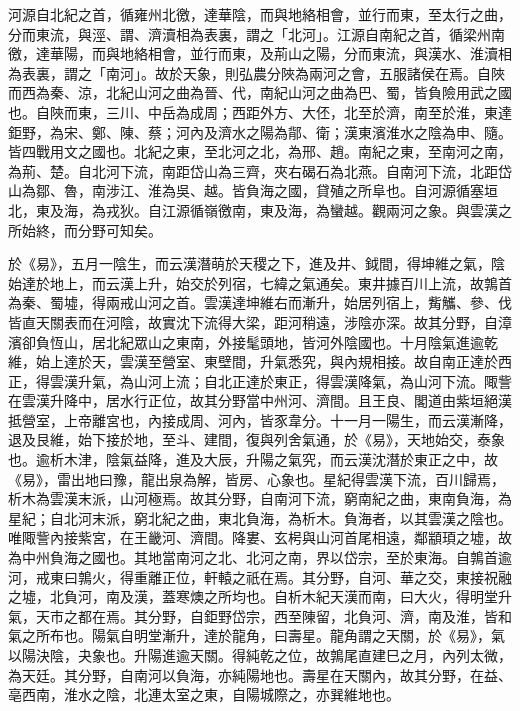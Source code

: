 \begin{pinyinscope}
 河源自北紀之首，循雍州北徼，達華陰，而與地絡相會，並行而東，至太行之曲，分而東流，與涇、謂、濟瀆相為表裏，謂之「北河」。江源自南紀之首，循梁州南徼，達華陽，而與地絡相會，並行而東，及荊山之陽，分而東流，與漢水、淮瀆相為表裏，謂之「南河」。故於天象，則弘農分陜為兩河之會，五服諸侯在焉。自陜而西為秦、涼，北紀山河之曲為晉、代，南紀山河之曲為巴、蜀，皆負險用武之國也。自陜而東，三川、中岳為成周；西距外方、大伾，北至於濟，南至於淮，東達鉅野，為宋、鄭、陳、蔡；河內及濟水之陽為鄁、衛；漢東濱淮水之陰為申、隨。皆四戰用文之國也。北紀之東，至北河之北，為邢、趙。南紀之東，至南河之南，為荊、楚。自北河下流，南距岱山為三齊，夾右碣石為北燕。自南河下流，北距岱山為鄒、魯，南涉江、淮為吳、越。皆負海之國，貸殖之所阜也。自河源循塞垣北，東及海，為戎狄。自江源循嶺徼南，東及海，為蠻越。觀兩河之象。與雲漢之所始終，而分野可知矣。



 於《易》，五月一陰生，而云漢潛萌於天稷之下，進及井、鉞間，得坤維之氣，陰始達於地上，而云漢上升，始交於列宿，七緯之氣通矣。東井據百川上流，故鶉首為秦、蜀墟，得兩戒山河之首。雲漢達坤維右而漸升，始居列宿上，觜觿、參、伐皆直天關表而在河陰，故實沈下流得大梁，距河稍遠，涉陰亦深。故其分野，自漳濱卻負恆山，居北紀眾山之東南，外接髦頭地，皆河外陰國也。十月陰氣進逾乾維，始上達於天，雲漢至營室、東壁間，升氣悉究，與內規相接。故自南正達於西正，得雲漢升氣，為山河上流；自北正達於東正，得雲漢降氣，為山河下流。陬訾在雲漢升降中，居水行正位，故其分野當中州河、濟間。且王良、閣道由紫垣絕漢抵營室，上帝離宮也，內接成周、河內，皆豕韋分。十一月一陽生，而云漢漸降，退及艮維，始下接於地，至斗、建間，復與列舍氣通，於《易》，天地始交，泰象也。逾析木津，陰氣益降，進及大辰，升陽之氣究，而云漢沈潛於東正之中，故《易》，雷出地曰豫，龍出泉為解，皆房、心象也。星紀得雲漢下流，百川歸焉，析木為雲漢末派，山河極焉。故其分野，自南河下流，窮南紀之曲，東南負海，為星紀；自北河末派，窮北紀之曲，東北負海，為析木。負海者，以其雲漢之陰也。唯陬訾內接紫宮，在王畿河、濟間。降婁、玄枵與山河首尾相遠，鄰顓頊之墟，故為中州負海之國也。其地當南河之北、北河之南，界以岱宗，至於東海。自鶉首逾河，戒東曰鶉火，得重離正位，軒轅之祇在焉。其分野，自河、華之交，東接祝融之墟，北負河，南及漢，蓋寒燠之所均也。自析木紀天漢而南，曰大火，得明堂升氣，天市之都在焉。其分野，自鉅野岱宗，西至陳留，北負河、濟，南及淮，皆和氣之所布也。陽氣自明堂漸升，達於龍角，曰壽星。龍角謂之天關，於《易》，氣以陽決陰，夬象也。升陽進逾天關。得純乾之位，故鶉尾直建巳之月，內列太微，為天廷。其分野，自南河以負海，亦純陽地也。壽星在天關內，故其分野，在益、亳西南，淮水之陰，北連太室之東，自陽城際之，亦巽維地也。




\end{pinyinscope}
